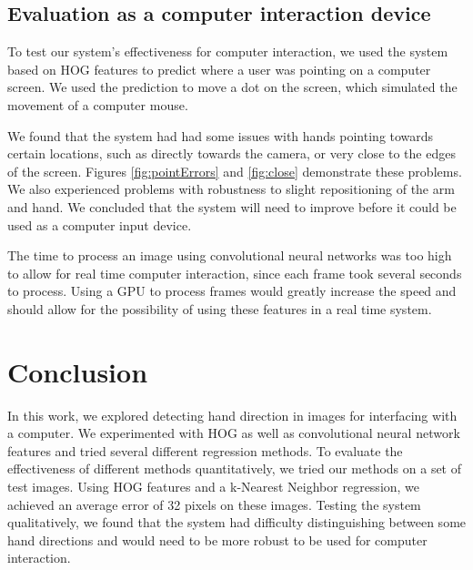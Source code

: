 \documentclass[10pt,twocolumn,letterpaper]{article}
\begin{document}
\subsection{Evaluation as a computer interaction device}
	
To test our system's effectiveness for computer interaction, we used the system based on HOG features to predict where a user was pointing on a computer screen.  We used the prediction to move a dot on the screen, which simulated the movement of a computer mouse.

We found that the system had had some issues with hands pointing towards certain locations, such as directly towards the camera, or very close to the edges of the screen.  Figures \ref{fig:pointErrors} and \ref{fig:close} demonstrate these problems.  We also experienced problems with robustness to slight repositioning of the arm and hand.  We concluded that the system will need to improve before it could be used as a computer input device.

The time to process an image using convolutional neural networks was too high to allow for real time computer interaction, since each frame took several seconds to process.  Using a GPU to process frames would greatly increase the speed and should allow for the possibility of using these features in a real time system.

\section{Conclusion}
In this work, we explored detecting hand direction in images for interfacing with a computer.  We experimented with HOG as well as convolutional neural network features and tried several different regression methods.  To evaluate the effectiveness of different methods quantitatively, we tried our methods on a set of test images.  Using HOG features and a k-Nearest Neighbor regression, we achieved an average error of 32 pixels on these images.  Testing the system qualitatively, we found that the system had difficulty distinguishing between some hand directions and would need to be more robust to be used for computer interaction.


{\small


}
\end{document}
